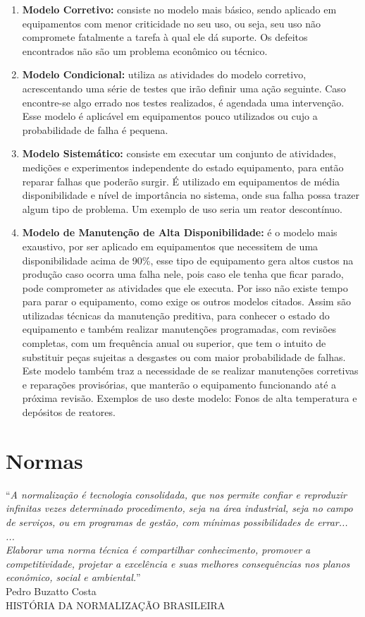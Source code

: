 \begin{enumerate}
	\item \textbf{Modelo Corretivo:} consiste no modelo mais básico, sendo aplicado em equipamentos com menor criticidade no seu uso, ou seja, seu uso não compromete fatalmente a tarefa à qual ele dá suporte. Os defeitos encontrados não são um problema econômico ou técnico. 
	\item \textbf{Modelo Condicional:} utiliza as atividades do modelo corretivo, acrescentando uma série de testes que irão definir uma ação seguinte. Caso encontre-se algo errado nos testes realizados, é agendada uma intervenção. Esse modelo é aplicável em equipamentos pouco utilizados ou cujo a probabilidade de falha é pequena.
	\item \textbf{Modelo Sistemático:} consiste em executar um conjunto de atividades, medições e experimentos independente do estado equipamento, para então reparar falhas que poderão surgir. É utilizado em equipamentos de média disponibilidade e nível de importância no sistema, onde sua falha possa trazer algum tipo de problema. Um exemplo de uso seria um reator descontínuo. 
	\item \textbf{Modelo de Manutenção de Alta Disponibilidade:} é o modelo mais exaustivo, por ser aplicado em equipamentos que necessitem de uma disponibilidade acima de 90\%, esse tipo de equipamento gera altos custos na produção caso ocorra uma falha nele, pois caso ele tenha que ficar parado, pode comprometer as atividades que ele executa. Por isso não existe tempo para parar o equipamento, como exige os outros modelos citados. Assim são utilizadas técnicas da manutenção preditiva, para conhecer o estado do equipamento e também realizar manutenções programadas, com revisões completas, com um frequência anual ou superior, que tem o intuito de substituir peças sujeitas a desgastes ou com maior probabilidade de falhas. 
	\\
	Este modelo também traz a necessidade de se realizar manutenções corretivas e reparações provisórias, que manterão o equipamento funcionando até a próxima revisão. Exemplos de uso deste modelo: Fonos de alta temperatura e depósitos de reatores.
\end{enumerate} 


\section{Normas}

\begin{flushright}
	“\textit{A normalização é tecnologia consolidada, que nos
permite confiar e reproduzir infinitas vezes determinado
procedimento, seja na área industrial, seja no campo de
serviços, ou em programas de gestão, com mínimas
possibilidades de errar...
\\
...
\\
Elaborar uma norma técnica é compartilhar
conhecimento, promover a competitividade, projetar a
excelência e suas melhores consequências nos planos
econômico, social e ambiental.}”
\\
Pedro Buzatto Costa
\\
HISTÓRIA DA NORMALIZAÇÃO BRASILEIRA
\end{flushright}

